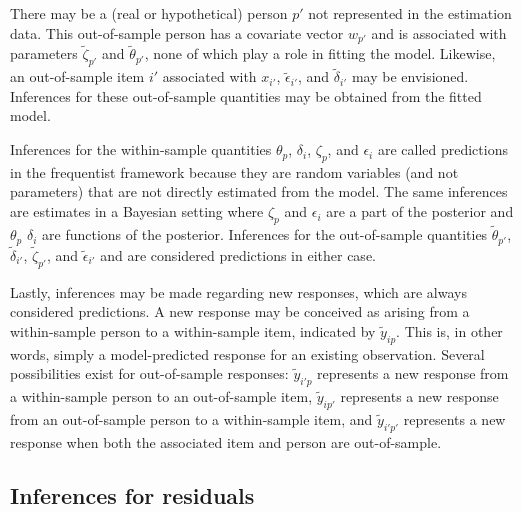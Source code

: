 \documentclass[12pt, letterpaper]{article}
\begin{document}
There may be a (real or hypothetical) person $p'$ not represented in the estimation data. This out-of-sample person has a covariate vector $w_{p'}$ and is associated with parameters $\tilde \zeta_{p'}$ and $\tilde \theta_{p'}$, none of which play a role in fitting the model. Likewise, an out-of-sample item $i'$ associated with $x_{i'}$, $\tilde \epsilon_{i'}$, and $\tilde \delta_{i'}$ may be envisioned. Inferences for these out-of-sample quantities may be obtained from the fitted model.

Inferences for the within-sample quantities $\theta_p$, $\delta_i$, $\zeta_p$, and $\epsilon_i$ are called predictions in the frequentist framework because they are random variables (and not parameters) that are not directly estimated from the model. The same inferences are estimates in a Bayesian setting where $\zeta_p$ and $\epsilon_i$ are a part of the posterior and $\theta_p$ $\delta_i$ are functions of the posterior. Inferences for the out-of-sample quantities $\tilde \theta_{p'}$, $\tilde \delta_{i'}$, $\tilde \zeta_{p'}$, and $\tilde \epsilon_{i'}$ and are considered predictions in either case.

Lastly, inferences may be made regarding new responses, which are always considered predictions. A new response may be conceived as arising from a within-sample person to a within-sample item, indicated by $\tilde y_{ip}$. This is, in other words, simply a model-predicted response for an existing observation. Several possibilities exist for out-of-sample responses: $\tilde y_{i'p}$ represents a new response from a within-sample person to an out-of-sample item, $\tilde y_{ip'}$ represents a new response from an out-of-sample person to a within-sample item, and $\tilde y_{i'p'}$ represents a new response when both the associated item and person are out-of-sample. 


\subsection{Inferences for residuals}
\end{document}
